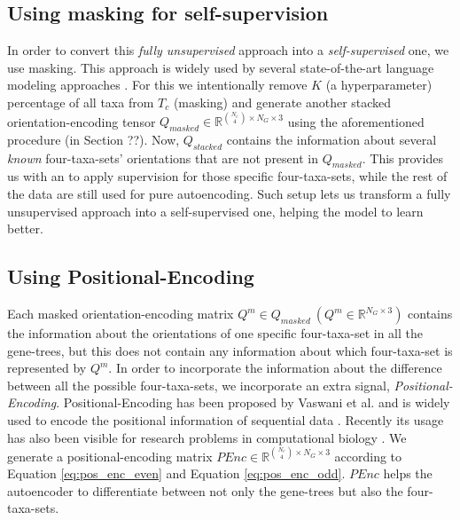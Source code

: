 \subsection{Using masking for self-supervision}
In order to convert this \textit{fully unsupervised} approach into a \textit{self-supervised} one, we use masking. This approach is widely used by several state-of-the-art language modeling approaches . For this we intentionally remove $K$ (a hyperparameter) percentage of all taxa from $T_c$ (masking)
and generate another stacked orientation-encoding tensor $Q_{masked} \in \mathbb{R}^{\binom{N_c}{4} \times N_G \times 3}$ using the aforementioned procedure (in Section ??). Now, $Q_{stacked}$ contains the information about several \textit{known} four-taxa-sets’ orientations that are not present in $Q_{masked}$. This provides us with an  to apply supervision for those specific four-taxa-sets, while the rest of the data are still used for pure autoencoding.  Such setup lets us transform a fully unsupervised approach into a self-supervised one, helping the model to learn better.


\subsection{Using Positional-Encoding}
\label{seq:pos_enc}
Each masked orientation-encoding matrix $Q^{m} \in Q_{masked}~(Q^{m} \in \mathbb{R}^{N_G \times 3})$ contains the information about the orientations of one specific four-taxa-set in all the gene-trees, but this does not contain any information about which four-taxa-set is represented by $Q^{m}$. 
In order to incorporate the information about the difference between all the possible four-taxa-sets, we incorporate an extra signal, \textit{Positional-Encoding}\SR{[cite]}. Positional-Encoding has been proposed by Vaswani et al.  and is widely used to encode the positional information of sequential data . Recently its usage has also been visible for research problems in computational biology . 
We generate a positional-encoding matrix $PEnc \in \mathbb{R}^{\binom{N_c}{4} \times N_G \times 3}$ according to Equation \ref{eq:pos_enc_even} and Equation \ref{eq:pos_enc_odd}. $PEnc$  helps the autoencoder to differentiate between not only the gene-trees but also the four-taxa-sets.

